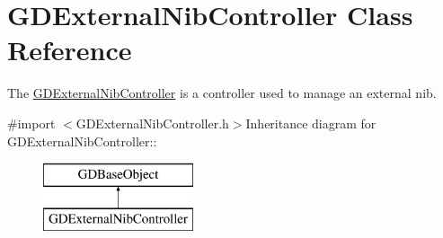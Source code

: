 \hypertarget{interface_g_d_external_nib_controller}{
\section{GDExternalNibController Class Reference}
\label{interface_g_d_external_nib_controller}
}


The \hyperlink{interface_g_d_external_nib_controller}{GDExternalNibController} is a controller used to manage an external nib.  


{\ttfamily \#import $<$GDExternalNibController.h$>$}Inheritance diagram for GDExternalNibController::\begin{figure}[H]
\begin{center}
\leavevmode
\includegraphics[height=2cm]{interface_g_d_external_nib_controller}
\end{center}
\end{figure}
